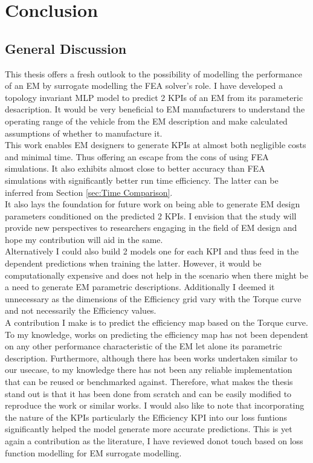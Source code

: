 \documentclass{report} %
\begin{document}
\chapter{Conclusion}

\section{General Discussion}\label{sec:General Discussion}
This thesis offers a fresh outlook to the possibility of modelling the performance of an \ac{EM} by surrogate modelling the \ac{FEA} solver's role.
I have developed a topology invariant \ac{MLP} model to predict 2 \ac{KPI}s of an \ac{EM} from its parameteric desacription. 
It would be very beneficial to \ac{EM} manufacturers to understand the operating range of the vehicle from the \ac{EM} description and make calculated assumptions of 
whether to manufacture it.\\
This work enables \ac{EM} designers to generate \ac{KPI}s at almost both negligible costs and minimal time.
Thus offering an escape from the cons of using \ac{FEA} simulations. It also exhibits almost close to better accuracy than \ac{FEA} simulations with significantly 
better run time efficiency. The latter can be inferred from Section \ref{sec:Time Comparison}.\\

It also lays the foundation for future work on being able to generate \ac{EM} design parameters conditioned on the predicted 2 KPIs.
I envision that the study will provide new perspectives to researchers engaging in the field of \ac{EM} design and hope my contribution will aid in the same.\\
Alternatively I could also build 2 models one for each \ac{KPI} and thus feed in the dependent predictions when training the latter. 
However, it would be computationally expensive and does not help in the scenario when there might be a need to generate \ac{EM} parametric descriptions.
Additionally I deemed it unnecessary as the dimensions of the Efficiency grid vary with the Torque curve and not necessarily the Efficiency values. \\

A contribution I make is to predict the efficiency map based on the Torque curve. To my knowledge, works on predicting the efficiency map has not 
been dependent on any other performance characteristic of the \ac{EM} let alone its parametric description. Furthermore, although there has been works undertaken similar 
to our usecase, to my knowledge there has not been any reliable implementation that can be reused or benchmarked against. Therefore, what makes the thesis stand out is 
that it has been done from scratch and can be easily modified to reproduce the work or similar works.
I would also like to note that incorporating the nature of the \ac{KPI}s particularly the Efficiency \ac{KPI} into our loss funtions significantly helped the model generate 
more accurate predictions. This is yet again a contribution as the literature, I have reviewed donot touch based on loss function modelling for \ac{EM} surrogate modelling.\\
\end{document}
